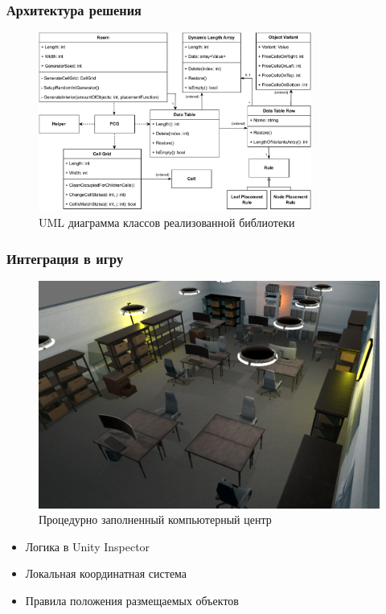 \documentclass{beamer}
\begin{document}
\begin{frame}
  \frametitle{Архитектура решения}
  \begin{figure}
    \centering
    \includegraphics[width=0.8\textwidth]{pictures/uml.pdf}
    \caption{UML диаграмма классов реализованной библиотеки}
  \end{figure}
\end{frame}

\begin{frame}
  \frametitle{Интеграция в игру}
  \begin{minipage}[m]{0.6\linewidth}
    \begin{figure}
      \centering
        \includegraphics[width=\textwidth]{pictures/computing_center.png}
        \caption{Процедурно заполненный компьютерный центр}
    \end{figure}
    \end{minipage}\hfill
    \begin{minipage}[m]{0.4\linewidth}
      \begin{itemize}
        \item Логика в Unity Inspector
        \item Локальная координатная система
        \item Правила положения размещаемых объектов
      \end{itemize}
    \end{minipage}
\end{frame}
\end{document}
